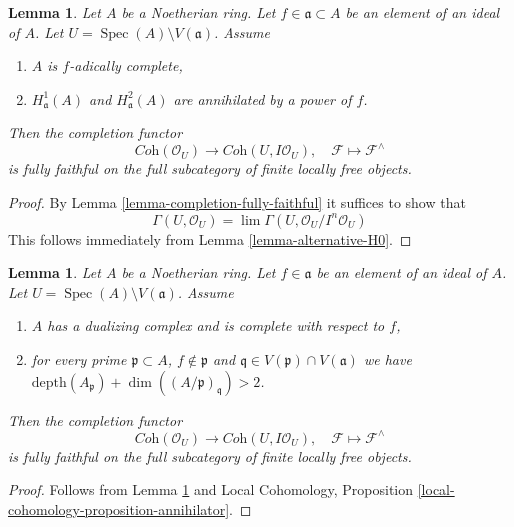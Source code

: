 \documentclass{stacks-project}
\theoremstyle{plain}
\newtheorem{lemma}[subsection]{Lemma}
\theoremstyle{definition}
\theoremstyle{remark}
\numberwithin{equation}{subsection}
\def\lim{\mathop{\mathrm{lim}}\nolimits}
\def\Spec{\mathop{\mathrm{Spec}}}
\begin{document}
\begin{lemma}
\label{lemma-fully-faithful-alternative}
Let $A$ be a Noetherian ring. Let $f \in \mathfrak a \subset A$
be an element of an ideal of $A$. Let $U = \Spec(A) \setminus V(\mathfrak a)$.
Assume
\begin{enumerate}
\item $A$ is $f$-adically complete,
\item $H^1_\mathfrak a(A)$ and $H^2_\mathfrak a(A)$ are
annihilated by a power of $f$.
\end{enumerate}
Then the completion functor
$$
\textit{Coh}(\mathcal{O}_U)
\longrightarrow
\textit{Coh}(U, I\mathcal{O}_U),
\quad
\mathcal{F} \longmapsto \mathcal{F}^\wedge
$$
is fully faithful on the full subcategory of
finite locally free objects.
\end{lemma}

\begin{proof}
By Lemma \ref{lemma-completion-fully-faithful}
it suffices to show that
$$
\Gamma(U, \mathcal{O}_U) =
\lim \Gamma(U, \mathcal{O}_U/I^n\mathcal{O}_U)
$$
This follows immediately from
Lemma \ref{lemma-alternative-H0}.
\end{proof}

\begin{lemma}
\label{lemma-fully-faithful-simple-two}
Let $A$ be a Noetherian ring. Let $f \in \mathfrak a$ be an element of
an ideal of $A$. Let $U = \Spec(A) \setminus V(\mathfrak a)$. Assume
\begin{enumerate}
\item $A$ has a dualizing complex and is complete with respect to $f$,
\item for every prime $\mathfrak p \subset A$, $f \not \in \mathfrak p$
and $\mathfrak q \in V(\mathfrak p) \cap V(\mathfrak a)$ we have
$\text{depth}(A_\mathfrak p) + \dim((A/\mathfrak p)_\mathfrak q) > 2$.
\end{enumerate}
Then the completion functor
$$
\textit{Coh}(\mathcal{O}_U)
\longrightarrow
\textit{Coh}(U, I\mathcal{O}_U),
\quad
\mathcal{F} \longmapsto \mathcal{F}^\wedge
$$
is fully faithful on the full subcategory of finite locally free objects.
\end{lemma}

\begin{proof}
Follows from Lemma \ref{lemma-fully-faithful-alternative} and
Local Cohomology, Proposition \ref{local-cohomology-proposition-annihilator}.
\end{proof}
\end{document}
